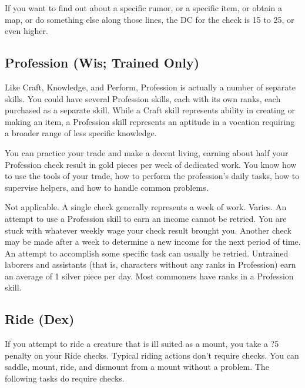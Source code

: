 If you want to find out about a specific rumor, or a specific item, or obtain a map, or do something else along those lines, the DC for the check is 15 to 25, or even higher.

\subsection{Profession (Wis; Trained Only)}
Like Craft, Knowledge, and Perform, Profession is actually a number of separate skills. You could have several Profession skills, each with its own ranks, each purchased as a separate skill. While a Craft skill represents ability in creating or making an item, a Profession skill represents an aptitude in a vocation requiring a broader range of less specific knowledge.

 You can practice your trade and make a decent living, earning about half your Profession check result in gold pieces per week of dedicated work. You know how to use the tools of your trade, how to perform the profession's daily tasks, how to supervise helpers, and how to handle common problems.

 Not applicable. A single check generally represents a week of work.
 Varies. An attempt to use a Profession skill to earn an income cannot be retried. You are stuck with whatever weekly wage your check result brought you. Another check may be made after a week to determine a new income for the next period of time. An attempt to accomplish some specific task can usually be retried.
 Untrained laborers and assistants (that is, characters without any ranks in Profession) earn an average of 1 silver piece per day. Most commoners have ranks in a Profession skill.

\subsection{Ride (Dex)}
If you attempt to ride a creature that is ill suited as a mount, you take a ?5 penalty on your Ride checks.
 Typical riding actions don't require checks. You can saddle, mount, ride, and dismount from a mount without a problem. The following tasks do require checks.

